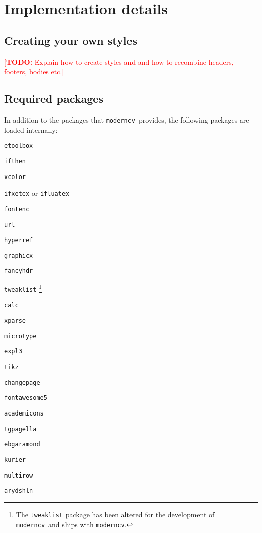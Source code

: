 \documentclass[a4paper, 11pt]{article}
\newcommand{\todox}[1]{\textcolor{red}{[\textbf{TODO:} #1]}}
\newcommand{\code}[1]{\lstinline!#1!}
\newcommand{\moderncv}{\code{moderncv}}
\newcommand{\Moderncv}{\moderncv~}
\begin{document}
\section{Implementation details}
\label{section:implementationDetails}

\subsection{Creating your own styles}
\todox{Explain how to create styles and and how to recombine headers, footers, bodies etc.}

\subsection{Required packages}
\label{section:implementationDetails:requiredPackages}
In addition to the packages that \Moderncv provides, the following packages are loaded internally:
\begin{itemize}
  \begin{multicols}{3}
    \item \code{etoolbox}
    \item \code{ifthen}
    \item \code{xcolor}
    \item \code{ifxetex} or \code{ifluatex}
    \item \code{fontenc}
    \item \code{url}
    \item \code{hyperref}
    \item \code{graphicx}
    \item \code{fancyhdr}
    \item \code{tweaklist}%
    \footnote{The \code{tweaklist} package has been altered for the development of \Moderncv and ships with \moderncv.}
    \item \code{calc}
    \item \code{xparse}
    \item \code{microtype}
    \item \code{expl3}
    \item \code{tikz}
    \item \code{changepage}
    \item \code{fontawesome5}
    \item \code{academicons}
    \item \code{tgpagella}
    \item \code{ebgaramond}
    \item \code{kurier}
    \item \code{multirow}
    \item \code{arydshln}
  \end{multicols}
\end{itemize}
\end{document}
